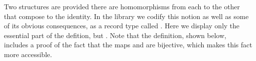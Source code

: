 Two structures are  provided there are homomorphisms from each to the
other that compose to the identity. In the \agdaalgebras library we codify this notion as
well as some of its obvious consequences, as a record type called .
\ifshort
Here we display only the essential part of the defition, but \seemedium.
\else
Note that the definition, shown below, includes a proof of the fact that the maps  and
 are bijective, which makes this fact more accessible.
\fi
\begin{code}%
\>[0]\<%
\\
\>[0]\AgdaSpace{}%
\AgdaModule{\AgdaUnderscore{}}\AgdaSpace{}%
\AgdaSymbol{(}\AgdaSpace{}%
\AgdaSymbol{:}\AgdaSpace{}%
\AgdaSpace{}%
\AgdaSpace{}%
\AgdaSymbol{)}\AgdaSpace{}%
\AgdaSymbol{(}\AgdaSpace{}%
\AgdaSymbol{:}\AgdaSpace{}%
\AgdaSpace{}%
\AgdaSpace{}%
\AgdaSymbol{)}\AgdaSpace{}%
\<%
\\
\>[0][@{}l@{\AgdaIndent{0}}]%
\>[1]\AgdaSpace{}%
\AgdaSpace{}%
\AgdaOperator{\AgdaFunction{𝔻[}}\AgdaSpace{}%
\AgdaSpace{}%
\AgdaOperator{\AgdaFunction{]}}\AgdaSpace{}%
\AgdaSpace{}%
\AgdaSymbol{(}\AgdaSpace{}%
\AgdaSpace{}%
\AgdaSymbol{)}\<%
\\
%
\>[1]\AgdaSpace{}%
\AgdaSpace{}%
\AgdaOperator{\AgdaFunction{𝔻[}}\AgdaSpace{}%
\AgdaSpace{}%
\AgdaOperator{\AgdaFunction{]}}\AgdaSpace{}%
\AgdaSpace{}%
\AgdaSymbol{()}\AgdaSpace{}%
\AgdaSpace{}%
\AgdaSymbol{(}\AgdaSpace{}%
\AgdaSpace{}%
\AgdaSpace{}%
\AgdaSpace{}%
\AgdaSymbol{)}\<%
\\
%
\\[\AgdaEmptyExtraSkip]%
%
\>[1]\AgdaSpace{}%
\AgdaSpace{}%
\AgdaSymbol{:}\AgdaSpace{}%
\AgdaSpace{}%
\AgdaSymbol{(}\AgdaSpace{}%
\AgdaSpace{}%
\AgdaSpace{}%
\AgdaSpace{}%
\AgdaSpace{}%
\AgdaSpace{}%

\end{code}
